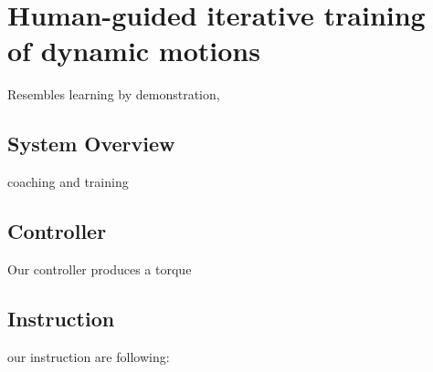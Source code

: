 \chapter{Human-guided iterative training \protect\\ of dynamic motions}
Resembles learning by demonstration,

\section{System Overview}
coaching and training

\section{Controller}
Our controller produces a torque

\section{Instruction}
our instruction are following:

